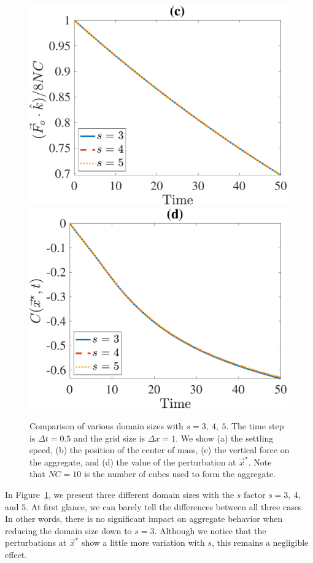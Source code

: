 \begin{figure}[ht]
\begin{center}
		\includegraphics[scale=0.35]{./figures/fig_NC10_s_Fo3_all}
		\includegraphics[scale=0.35]{./figures/fig_NC10_s_C_star}
	\caption{Comparison of various domain sizes with $ s = 3, \ 4, \ 5$. The time step is $\Delta t = 0.5$ and the grid size is $\Delta x = 1$. We show (a) the settling speed, (b) the position of the center of mass, (c) the vertical force on the aggregate, and (d) the value of the perturbation at $\vec{x}^{\star}$. Note that $NC = 10$ is the number of cubes used to form the aggregate.}
	\label{fig_NC10_compare_s}
\end{center}
\end{figure}
\par
In Figure~\ref{fig_NC10_compare_s}, we present three different domain sizes with the $s$ factor $s = 3, \ 4$, and $5$. At first glance, we can barely tell the differences between all three cases. In other words, there is no significant impact on aggregate behavior when reducing the domain size down to $s = 3$. Although we notice that the perturbations at $\vec{x}^{\star}$ show a little more variation with $s$, this remains a negligible effect.

